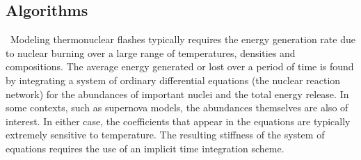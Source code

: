 \subsection{Algorithms}

~Modeling thermonuclear flashes typically requires the energy
generation rate due to nuclear burning over a large range of
temperatures, densities and compositions. The average energy generated
or lost over a period of time is found by integrating a system of
ordinary differential equations (the nuclear reaction network) for the
abundances of important nuclei and the total energy release.  In some
contexts, such as supernova models, the abundances themselves
are also of interest. In either case, the coefficients that appear in
the equations are typically extremely sensitive to temperature.  The
resulting stiffness of the system of equations requires the use of an
implicit time integration scheme.

